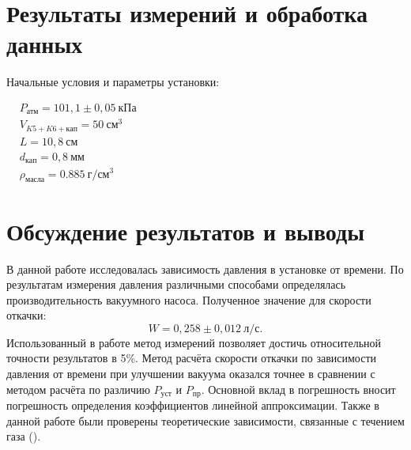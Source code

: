 \documentclass[a4paper, 12pt]{article}
\begin{document}
\section{Результаты измерений и обработка данных}

Начальные условия и параметры установки:

$\begin{aligned}
& P_{\text{атм}} = 101,1\pm0,05~кПа\\
& V_{K5+K6+кап} = 50~см^3 \\
& L = 10,8~см \\
& d_{кап} = 0,8~мм \\
& \rho_{масла} = 0.885~г/см^3
\end{aligned}$\\[0,5 cm]

\section{Обсуждение результатов и выводы}

В данной работе исследовалась зависимость давления в установке от времени. По результатам измерения давления различными способами определялась производительность вакуумного насоса. Полученное значение для скорости откачки:
\[\boxed{W = 0,258\pm0,012~л/с}.\]
Использованный в работе метод измерений позволяет достичь относительной точности результатов в 5\%. Метод расчёта скорости откачки по зависимости давления от времени при улучшении вакуума оказался точнее в сравнении с методом расчёта по различию $P_{уст}$ и $P_{пр}$. Основной вклад в погрешность вносит погрешность определения коэффициентов линейной аппроксимации.
Также в данной работе были проверены теоретические зависимости, связанные с течением газа ().
\end{document}
